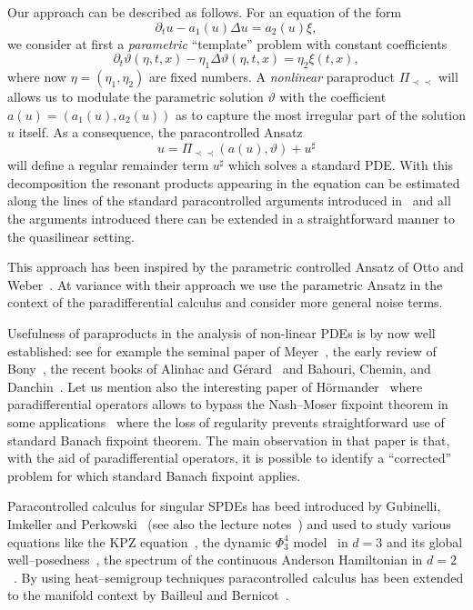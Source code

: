 \documentclass[11pt,reqno]{amsart}
\newcommand{\precprec}{\prec\!\!\!\prec}
\newcommand{\tmtextit}[1]{{\itshape{#1}}}
\begin{document}
Our approach can be described as follows. For an equation of the form
\[ \partial_t u - a_1 (u) \Delta u = a_2 (u) \xi, \]
we consider at first a \tmtextit{parametric} ``template'' problem with
constant coefficients
\begin{equation}
  \partial_t \vartheta (\eta, t, x) - \eta_1 \Delta \vartheta (\eta, t, x) =
  \eta_2 \xi (t, x), \label{eq:template}
\end{equation}
where now $\eta = (\eta_1, \eta_2)$ are fixed numbers. A \tmtextit{nonlinear}
paraproduct $\Pi_{\precprec}$ will allows us to modulate the parametric
solution $\vartheta$ with the coefficient $a (u) = (a_1 (u), a_2 (u))$ as to
capture the most irregular part of the solution $u$ itself. As a consequence,
the paracontrolled Ansatz
\[ u = \Pi_{\precprec} (a (u), \vartheta) + u^{\sharp} \]
will define a regular remainder term $u^{\sharp}$ which solves a standard PDE.
With this decomposition the resonant products appearing in the equation can be
estimated along the lines of the standard paracontrolled arguments introduced
in~{\cite{gubinelli_paracontrolled_2015}} and all the arguments introduced
there can be extended in a straightforward manner to the quasilinear setting.

This approach has been inspired by the parametric controlled Ansatz of Otto
and Weber~{\cite{otto_quasilinear_2016}}. At variance with their approach we
use the parametric Ansatz in the context of the paradifferential calculus and
consider more general noise terms.

Usefulness of paraproducts in the analysis of non-linear PDEs is by now well
established: see for example the seminal paper of
Meyer~{\cite{meyer_remarques_1981}}, the early review of
Bony~{\cite{bony_microlocal_1991}}, the recent books of Alinhac and
G{\'e}rard~{\cite{alinhac_operateurs_1991}} and Bahouri, Chemin, and
Danchin~{\cite{bahouri_fourier_2011}}. Let us mention also the interesting
paper of H{\"o}rmander~{\cite{hormander_nash_moser_1990}} where
paradifferential operators allows to bypass the Nash--Moser fixpoint theorem
in some applications \ where the loss of regularity prevents straightforward
use of standard Banach fixpoint theorem. The main observation in that paper is
that, with the aid of paradifferential operators, it is possible to identify a
``corrected'' problem for which standard Banach fixpoint applies.

Paracontrolled calculus for singular SPDEs has beed introduced by Gubinelli,
Imkeller and Perkowski~{\cite{gubinelli_paracontrolled_2015}} (see also the
lecture notes~{\cite{gubinelli_lectures_2015}}) and used to study various
equations like the KPZ equation~{\cite{gubinelli_kpz_2015}}, the dynamic
$\Phi^4_3$ model~{\cite{catellier_paracontrolled_2013}} in $d = 3$ and its
global well--posedness~{\cite{mourrat_global_2016}}, the spectrum of the
continuous Anderson Hamiltonian in $d = 2$~{\cite{allez_continuous_2015}}. By
using heat--semigroup techniques paracontrolled calculus has been extended to
the manifold context by Bailleul and Bernicot~{\cite{bailleul_heat_2015}}.
\end{document}
